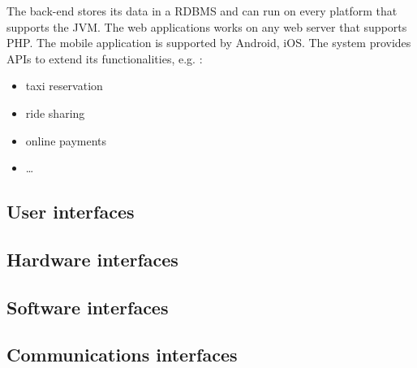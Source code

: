 The back-end stores its data in a RDBMS and  can run on every platform that supports the JVM.
The web applications works on any web server that supports PHP. The mobile application is supported by Android, iOS. The system provides APIs to extend its functionalities, e.g. :
\begin{itemize}
\item taxi reservation
\item ride sharing
\item online payments
\item \ldots
\end{itemize}


\subsection{User interfaces}
\subsection{Hardware interfaces}
\subsection{Software interfaces}
\subsection{Communications interfaces}